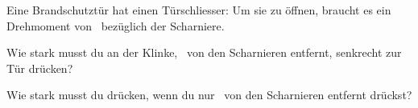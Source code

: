 Eine Brandschutztür hat einen Türschliesser: Um sie zu öffnen, braucht es ein Drehmoment von \MO\ bezüglich der Scharniere.

\begin{abcliste}
\abc
Wie stark musst du an der Klinke, \daO\ von den Scharnieren entfernt, senkrecht zur Tür drücken?

\abc
Wie stark musst du drücken, wenn du nur \dbO\ von den Scharnieren entfernt drückst?
\end{abcliste}
